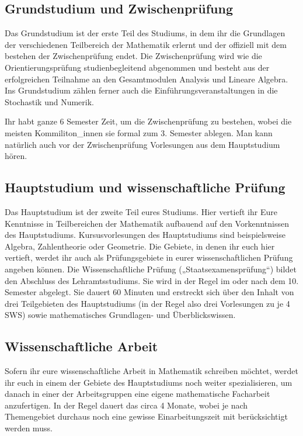 \subsection{Grundstudium und Zwischenprüfung}
Das Grundstudium ist der erste Teil des Studiums, in dem ihr die Grundlagen der verschiedenen Teilbereich der Mathematik erlernt und der offiziell mit dem bestehen der Zwischenprüfung endet. Die Zwischenprüfung wird wie die Orientierungsprüfung studienbegleitend abgenommen und besteht aus der erfolgreichen Teilnahme an den Gesamtmodulen Analysis und Lineare Algebra. Ins Grundstudium zählen ferner auch die Einführungsveranstaltungen in die Stochastik und Numerik.

Ihr habt ganze 6 Semester Zeit, um die Zwischenprüfung zu bestehen, wobei die meisten Kommiliton\_innen sie formal zum 3. Semester ablegen.  Man kann natürlich auch vor der Zwischenprüfung Vorlesungen aus dem Hauptstudium hören.

\subsection{Hauptstudium und wissenschaftliche Prüfung}
Das Hauptstudium ist der zweite Teil eures Studiums. Hier vertieft ihr Eure Kenntnisse in Teilbereichen der Mathematik aufbauend auf den Vorkenntnissen des Hauptstudiums. Kursusvorlesungen des Hauptstudiums sind beispielsweise Algebra, Zahlentheorie oder Geometrie. Die Gebiete, in denen ihr euch hier vertieft, werdet ihr auch als Prüfungsgebiete in eurer wissenschaftlichen Prüfung angeben können. Die Wissenschaftliche Prüfung („Staatsexamensprüfung“) bildet den Abschluss des Lehramtsstudiums. Sie wird in der Regel im oder nach dem 10. Semester abgelegt. Sie dauert 60 Minuten und erstreckt sich über den Inhalt von drei Teilgebieten des Hauptstudiums (in der Regel also drei Vorlesungen zu je 4 \gls{SWS}) sowie mathematisches Grundlagen- und Überblickswissen.

\subsection{Wissenschaftliche Arbeit}

Sofern ihr eure wissenschaftliche Arbeit in Mathematik schreiben möchtet, werdet ihr euch in einem der Gebiete des Hauptstudiums noch weiter spezialisieren, um danach in einer der Arbeitsgruppen eine eigene mathematische Facharbeit anzufertigen. In der Regel dauert das circa 4 Monate, wobei je nach Themengebiet durchaus noch eine gewisse Einarbeitungszeit mit berücksichtigt werden muss.


